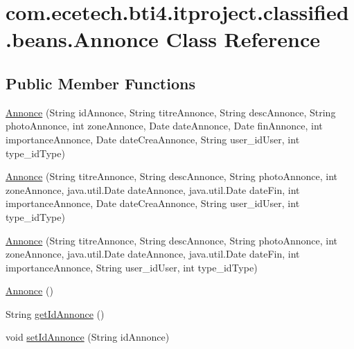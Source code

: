\hypertarget{classcom_1_1ecetech_1_1bti4_1_1itproject_1_1classified_1_1beans_1_1_annonce}{}\section{com.\+ecetech.\+bti4.\+itproject.\+classified.\+beans.\+Annonce Class Reference}
\label{classcom_1_1ecetech_1_1bti4_1_1itproject_1_1classified_1_1beans_1_1_annonce}
\subsection*{Public Member Functions}
\begin{DoxyCompactItemize}
\item 
\hyperlink{classcom_1_1ecetech_1_1bti4_1_1itproject_1_1classified_1_1beans_1_1_annonce_aa1cd2c08d3b32086a20d786bafe463d2}{Annonce} (String id\+Annonce, String titre\+Annonce, String desc\+Annonce, String photo\+Annonce, int zone\+Annonce, Date date\+Annonce, Date fin\+Annonce, int importance\+Annonce, Date date\+Crea\+Annonce, String user\+\_\+id\+User, int type\+\_\+id\+Type)
\item 
\hyperlink{classcom_1_1ecetech_1_1bti4_1_1itproject_1_1classified_1_1beans_1_1_annonce_a6193a98a9a8d6c796f767cbfa320772f}{Annonce} (String titre\+Annonce, String desc\+Annonce, String photo\+Annonce, int zone\+Annonce, java.\+util.\+Date date\+Annonce, java.\+util.\+Date date\+Fin, int importance\+Annonce, Date date\+Crea\+Annonce, String user\+\_\+id\+User, int type\+\_\+id\+Type)
\item 
\hyperlink{classcom_1_1ecetech_1_1bti4_1_1itproject_1_1classified_1_1beans_1_1_annonce_ab8cfd4e21b55330de2c707946cb1e2ee}{Annonce} (String titre\+Annonce, String desc\+Annonce, String photo\+Annonce, int zone\+Annonce, java.\+util.\+Date date\+Annonce, java.\+util.\+Date date\+Fin, int importance\+Annonce, String user\+\_\+id\+User, int type\+\_\+id\+Type)
\item 
\hyperlink{classcom_1_1ecetech_1_1bti4_1_1itproject_1_1classified_1_1beans_1_1_annonce_a9764a1cdc2bff3348f229197b613b94f}{Annonce} ()
\item 
String \hyperlink{classcom_1_1ecetech_1_1bti4_1_1itproject_1_1classified_1_1beans_1_1_annonce_a8322c885bfb8ad443531750129c882c5}{get\+Id\+Annonce} ()
\item 
void \hyperlink{classcom_1_1ecetech_1_1bti4_1_1itproject_1_1classified_1_1beans_1_1_annonce_a5d034a439f1099ab366b9885c71b2bfb}{set\+Id\+Annonce} (String id\+Annonce)

\end{DoxyCompactItemize}
